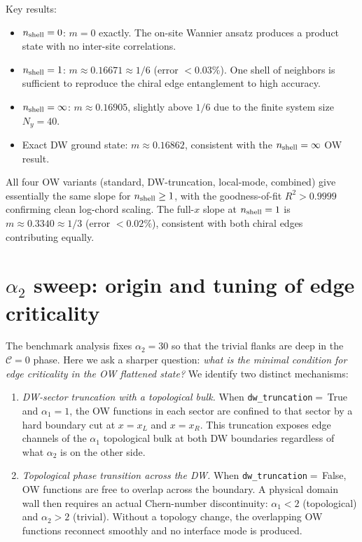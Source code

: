 \documentclass[aps,prb,twocolumn,showpacs,floatfix]{revtex4-2}
\newcommand{\nshell}{n_{\rm shell}}
\newcommand{\Cchern}{\mathcal{C}}
\begin{document}
Key results:
\begin{itemize}
  \item $\nshell = 0$: $m = 0$ exactly.  The on-site Wannier ansatz produces a
    product state with no inter-site correlations.
  \item $\nshell = 1$: $m \approx 0.16671 \approx 1/6$ (error $< 0.03\%$).
    One shell of neighbors is sufficient to reproduce the chiral edge
    entanglement to high accuracy.
  \item $\nshell = \infty$: $m \approx 0.16905$, slightly above $1/6$ due to
    the finite system size $N_y = 40$.
  \item Exact DW ground state: $m \approx 0.16862$, consistent with the
    $\nshell = \infty$ OW result.
\end{itemize}

All four OW variants (standard, DW-truncation, local-mode, combined) give
essentially the same slope for $\nshell \geq 1$, with the goodness-of-fit
$R^2 > 0.9999$ confirming clean log-chord scaling.
The full-$x$ slope at $\nshell = 1$ is $m \approx 0.3340 \approx 1/3$
(error $< 0.02\%$), consistent with both chiral edges contributing equally.

\section{$\alpha_2$ sweep: origin and tuning of edge criticality}
\label{sec:alpha2}

The benchmark analysis fixes $\alpha_2 = 30$ so that the trivial flanks are
deep in the $\Cchern = 0$ phase.
Here we ask a sharper question: \emph{what is the minimal condition for edge
criticality in the OW flattened state?}
We identify two distinct mechanisms:
\begin{enumerate}
  \item \emph{DW-sector truncation with a topological bulk.}
    When \texttt{dw\_truncation}$=$\,True and $\alpha_1 = 1$, the OW functions
    in each sector are confined to that sector by a hard boundary cut at
    $x = x_L$ and $x = x_R$.
    This truncation exposes edge channels of the $\alpha_1$ topological bulk
    at both DW boundaries regardless of what $\alpha_2$ is on the other side.
  \item \emph{Topological phase transition across the DW.}
    When \texttt{dw\_truncation}$=$\,False, OW functions are free to overlap
    across the boundary.
    A physical domain wall then requires an actual Chern-number discontinuity:
    $\alpha_1 < 2$ (topological) and $\alpha_2 > 2$ (trivial).
    Without a topology change, the overlapping OW functions reconnect smoothly
    and no interface mode is produced.
\end{enumerate}
\end{document}
